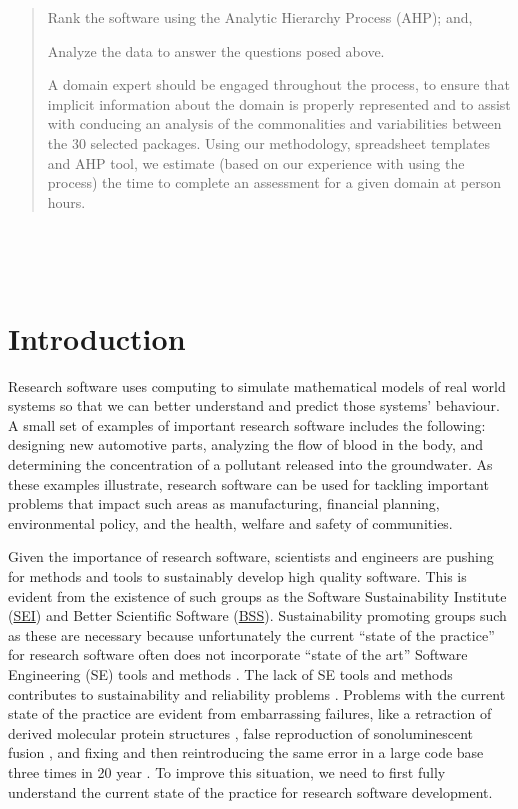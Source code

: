 \documentclass[letterpaper,cleveref]{lipics-v2019}
\newcounter{totHours} %
\begin{document}
\begin{abstract}
\begin{inparaenum}[i)]
    \item Rank the software using the Analytic Hierarchy Process (AHP); and,
    \item Analyze the data to answer the questions posed above.
  \end{inparaenum}
  A domain expert should be engaged throughout the process, to ensure that
  implicit information about the domain is properly represented and to assist
  with conducing an analysis of the commonalities and variabilities between the
  30 selected packages.  Using our methodology, spreadsheet templates and AHP
  tool, we estimate (based on our experience with using the process) the time to
  complete an assessment for a given domain at  person hours.
\end{abstract}

~\newpage

\tableofcontents

~\newpage

\section{Introduction} \label{SecIntroduction}

Research software uses computing to simulate mathematical models of real world
systems so that we can better understand and predict those systems' behaviour.  A
small set of examples of important research software includes the
following: designing new automotive parts, analyzing the flow of blood in the
body, and determining the concentration of a pollutant released into the
groundwater.  As these examples illustrate, research software can be used for
tackling important problems that impact such areas as manufacturing, financial
planning, environmental policy, and the health, welfare and safety of
communities.

Given the importance of research software, scientists and engineers are pushing
for methods and tools to sustainably develop high quality software.  This is
evident from the existence of such groups as the Software Sustainability
Institute (\href{https://www.software.ac.uk/} {SEI}) and Better Scientific
Software (\href{https://bssw.io/} {BSS}).  Sustainability promoting groups such
as these are necessary because unfortunately the current ``state of the
practice'' for research software often does not incorporate ``state of the art''
Software Engineering (SE) tools and methods \citep{JohansonAndHasselbring2018}.
The lack of SE tools and methods contributes to sustainability and reliability
problems \citep{FaulkEtAl2009}.  Problems with the current state of the practice
are evident from embarrassing failures, like a retraction of derived molecular
protein structures \citep{Miller2006}, false reproduction of sonoluminescent
fusion \citep{PostAndVotta2005}, and fixing and then reintroducing the same
error in a large code base three times in 20 year
\citep{MilewiczAndRaybourn2018}.  To improve this situation, we need to first
fully understand the current state of the practice for research software
development.
\end{document}
